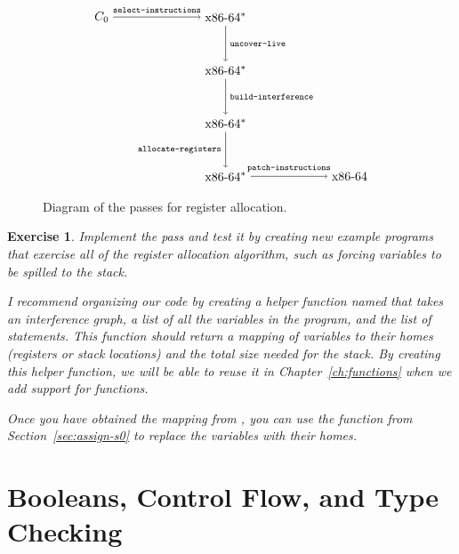 \documentclass[11pt]{book}
\newtheorem{exercise}[theorem]{Exercise}
\begin{document}
\begin{figure}[tbp]
\[
\begin{tikzpicture}[baseline=(current  bounding  box.center)]
\node (1) at (-3.5,0)     {$C_0$};
\node (2)  at (0,0)     {$\text{x86-64}^{*}$};
\node (3)  at (0,-1.5)  {$\text{x86-64}^{*}$};
\node (4)  at (0,-3)    {$\text{x86-64}^{*}$};
\node (5)  at (0,-4.5)  {$\text{x86-64}^{*}$};
\node (6)  at (3.5,-4.5)  {$\text{x86-64}$};

\path[->] (1) edge [above] node {\ttfamily\scriptsize select-instructions} (2);
\path[->] (2) edge [right] node {\ttfamily\scriptsize uncover-live}       (3);
\path[->] (3) edge [right] node {\ttfamily\scriptsize build-interference} (4);
\path[->] (4) edge [left]  node {\ttfamily\scriptsize allocate-registers} (5);
\path[->] (5) edge [above] node {\ttfamily\scriptsize patch-instructions} (6);
\end{tikzpicture}
\]
\caption{Diagram of the passes for register allocation.}
\label{fig:reg-alloc-passes}
\end{figure}

\begin{exercise}\normalfont
Implement the pass  and test it by creating
new example programs that exercise all of the register allocation
algorithm, such as forcing variables to be spilled to the stack.

I recommend organizing our code by creating a helper function named
 that takes an interference graph, a list of all
the variables in the program, and the list of statements. This
function should return a mapping of variables to their homes
(registers or stack locations) and the total size needed for the
stack. By creating this helper function, we will be able to reuse it
in Chapter~\ref{ch:functions} when we add support for functions.

Once you have obtained the mapping from , you can
use the  function from Section~\ref{sec:assign-s0}
to replace the variables with their homes.
\end{exercise}




\chapter{Booleans, Control Flow, and Type Checking}
\label{ch:bool-types}
\end{document}

